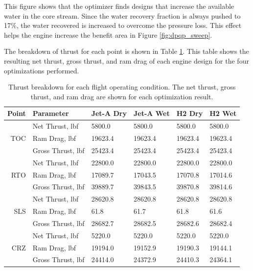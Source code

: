 \documentclass[conf]{new-aiaa}
\begin{document}
This figure shows that the optimizer finds designs that increase the available water in the core stream.
Since the water recovery fraction is always pushed to 17\%, the water recovered is increased to overcome the pressure loss.
This effect helps the engine increase the benefit area in Figure \ref{fig:dpqp_sweep}.

The breakdown of thrust for each point is shown in Table \ref{tab:thrust}.
This table shows the resulting net thrust, gross thrust, and ram drag of each engine design for the four optimizations performed.

\begin{table}[hbt!]
    \centering
    \caption{Thrust breakdown for each flight operating condition.
        The net thrust, gross thrust, and ram drag are shown for each optimization result.
    }
    \small
    \renewcommand{\arraystretch}{1.2}
    \begin{tabular}{r l l l l l}
        Point & Parameter              & Jet-A Dry & Jet-A Wet & H2 Dry  & H2 Wet  \\
        \toprule
              & Net Thrust, \si{lbf}   & 5800.0    & 5800.0    & 5800.0  & 5800.0  \\
        TOC   & Ram Drag, \si{lbf}     & 19623.4   & 19623.4   & 19623.4 & 19623.4 \\
              & Gross Thrust, \si{lbf} & 25423.4   & 25423.4   & 25423.4 & 25423.4 \\
        \hline
              & Net Thrust, \si{lbf}   & 22800.0   & 22800.0   & 22800.0 & 22800.0 \\
        RTO   & Ram Drag, \si{lbf}     & 17089.7   & 17043.5   & 17070.8 & 17014.6 \\
              & Gross Thrust, \si{lbf} & 39889.7   & 39843.5   & 39870.8 & 39814.6 \\
        \hline
              & Net Thrust, \si{lbf}   & 28620.8   & 28620.8   & 28620.8 & 28620.8 \\
        SLS   & Ram Drag, \si{lbf}     & 61.8      & 61.7      & 61.8    & 61.6    \\
              & Gross Thrust, \si{lbf} & 28682.7   & 28682.5   & 28682.6 & 28682.4 \\
        \hline
              & Net Thrust, \si{lbf}   & 5220.0    & 5220.0    & 5220.0  & 5220.0  \\
        CRZ   & Ram Drag, \si{lbf}     & 19194.0   & 19152.9   & 19190.3 & 19144.1 \\
              & Gross Thrust, \si{lbf} & 24414.0   & 24372.9   & 24410.3 & 24364.1 \\
        \bottomrule
    \end{tabular}
    \label{tab:thrust}
\end{table}
\end{document}
